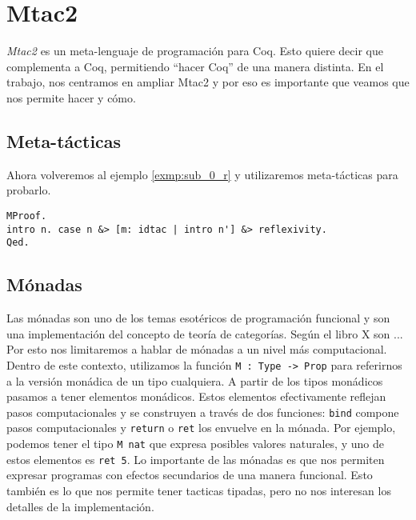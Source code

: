 \section{Mtac2}

\textit{Mtac2} es un meta-lenguaje de programación para Coq. Esto quiere decir que complementa a Coq, permitiendo ``hacer Coq'' de una manera distinta. En el trabajo, nos centramos en ampliar Mtac2 y por eso es importante que veamos que nos permite hacer y cómo.

\subsection{Meta-tácticas}

Ahora volveremos al ejemplo \ref{exmp:sub_0_r} y utilizaremos meta-tácticas para probarlo.
\begin{exmp}\label{exmp:sub_0_r_mtac2}
\begin{lstlisting}
MProof.
intro n. case n &> [m: idtac | intro n'] &> reflexivity.
Qed.
\end{lstlisting}
\end{exmp}

\subsection{Mónadas}
Las mónadas son uno de los temas esotéricos de programación funcional y son una implementación del concepto de teoría de categorías. Según el libro X son ...
Por esto nos limitaremos a hablar de mónadas a un nivel más computacional. Dentro de este contexto, utilizamos la función \lstinline{M : Type -> Prop} para referirnos a la versión monádica de un tipo cualquiera. A partir de los tipos monádicos pasamos a tener elementos monádicos. Estos elementos efectivamente reflejan pasos computacionales y se construyen a través de dos funciones: \lstinline{bind} compone pasos computacionales y \lstinline{return} o \lstinline{ret} los envuelve en la mónada. Por ejemplo, podemos tener el tipo \lstinline{M nat} que expresa posibles valores naturales, y uno de estos elementos es \lstinline{ret 5}. Lo importante de las mónadas es que nos permiten expresar programas con efectos secundarios de una manera funcional.
Esto también es lo que nos permite tener tacticas tipadas, pero no nos interesan los detalles de la implementación.

